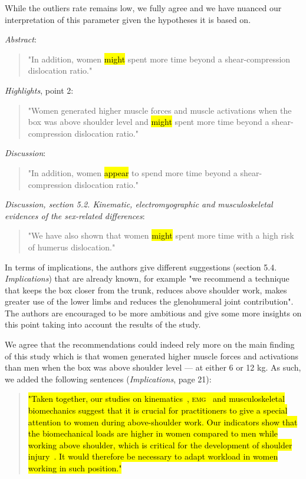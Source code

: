 \documentclass[preprint,review,12pt]{elsarticle}
\begin{document}
    While the outliers rate remains low, we fully agree and we have nuanced our interpretation of this parameter given the hypotheses it is based on.

    \textit{Abstract}:
    \begin{quote}
        "In addition, women \hl{might} spent more time beyond a shear-compression dislocation ratio."
    \end{quote}

    \textit{Highlights}, point 2:
    \begin{quote}
        "Women generated higher muscle forces and muscle activations when the box was above shoulder level and \hl{might} spent more time beyond a shear-compression dislocation ratio."
    \end{quote}

    \textit{Discussion}:
    \begin{quote}
        "In addition, women \hl{appear} to spend more time beyond a shear-compression dislocation ratio."
    \end{quote}

    \textit{Discussion, section 5.2. Kinematic, electromyographic and musculoskeletal evidences of the sex-related differences}:
    \begin{quote}
        "We have also shown that women \hl{might} spent more time with a high risk of humerus dislocation."
    \end{quote}

    \begin{formal}
        In terms of implications, the authors give different suggestions (section 5.4. \textit{Implications}) that are already known, for example "we recommend a technique that keeps the box closer from the trunk, reduces above shoulder work, makes greater use of the lower limbs and reduces the glenohumeral joint contribution".
        The authors are encouraged to be more ambitious and give some more insights on this point taking into account the results of the study.
    \end{formal}

    We agree that the recommendations could indeed rely more on the main finding of this study which is that women generated higher muscle forces and activations than men when the box was above shoulder level --- at either 6 or 12 kg.
    As such, we added the following sentences (\textit{Implications}, page 21):

    \begin{quote}
        \hl{"Taken together, our studies on kinematics~{\citep{Martinez2019-mm}}, \textsc{emg}~{\citep{Bouffard2019-fd}} and musculoskeletal biomechanics suggest that it is crucial for practitioners to give a special attention to women during above-shoulder work.
        Our indicators show that the biomechanical loads are higher in women compared to men while working above shoulder, which is critical for the development of shoulder injury~{\citep{Van_der_Molen2017-sb}}.
        It would therefore be necessary to adapt workload in women working in such position."}
    \end{quote}
\end{document}

